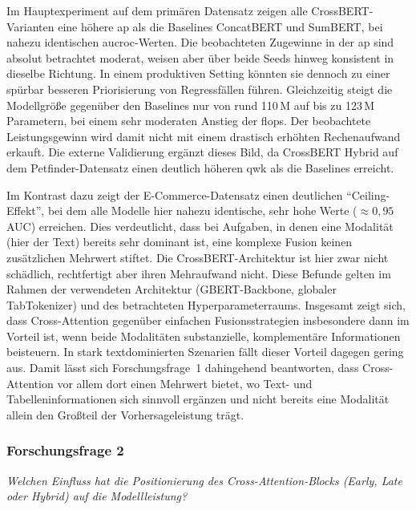Im Hauptexperiment auf dem primären Datensatz zeigen alle CrossBERT-Varianten eine höhere \Gls{ap} als die Baselines ConcatBERT und SumBERT, bei nahezu identischen \Gls{aucroc}-Werten. Die beobachteten Zugewinne in der \Gls{ap} sind absolut betrachtet moderat, weisen aber über beide Seeds hinweg konsistent in dieselbe Richtung. In einem produktiven Setting könnten sie dennoch zu einer spürbar besseren Priorisierung von Regressfällen führen. Gleichzeitig steigt die Modellgröße gegenüber den Baselines nur von rund 110\,M auf bis zu 123\,M Parametern, bei einem sehr moderaten Anstieg der \Gls{flops}. Der beobachtete Leistungsgewinn wird damit nicht mit einem drastisch erhöhten Rechenaufwand erkauft. Die externe Validierung ergänzt dieses Bild, da CrossBERT Hybrid auf dem Petfinder-Datensatz einen deutlich höheren \Gls{qwk} als die Baselines erreicht.

Im Kontrast dazu zeigt der E-Commerce-Datensatz einen deutlichen \enquote{Ceiling-Effekt}, bei dem alle Modelle hier nahezu identische, sehr hohe Werte ($\approx 0{,}95$ AUC) erreichen. Dies verdeutlicht, dass bei Aufgaben, in denen eine Modalität (hier der Text) bereits sehr dominant ist, eine komplexe Fusion keinen zusätzlichen Mehrwert stiftet. Die CrossBERT-Architektur ist hier zwar nicht schädlich, rechtfertigt aber ihren Mehraufwand nicht. Diese Befunde gelten im Rahmen der verwendeten Architektur (GBERT-Backbone, globaler TabTokenizer) und des betrachteten Hyperparameterraums. Insgesamt zeigt sich, dass Cross-Attention gegenüber einfachen Fusionsstrategien insbesondere dann im Vorteil ist, wenn beide Modalitäten substanzielle, komplementäre Informationen beisteuern. In stark textdominierten Szenarien fällt dieser Vorteil dagegen gering aus. Damit lässt sich Forschungsfrage~1 dahingehend beantworten, dass Cross-Attention vor allem dort einen Mehrwert bietet, wo Text- und Tabelleninformationen sich sinnvoll ergänzen und nicht bereits eine Modalität allein den Großteil der Vorhersageleistung trägt.

\subsubsection*{Forschungsfrage 2}
\textit{Welchen Einfluss hat die Positionierung des Cross-Attention-Blocks (Early, Late oder Hybrid) auf die Modellleistung?}

